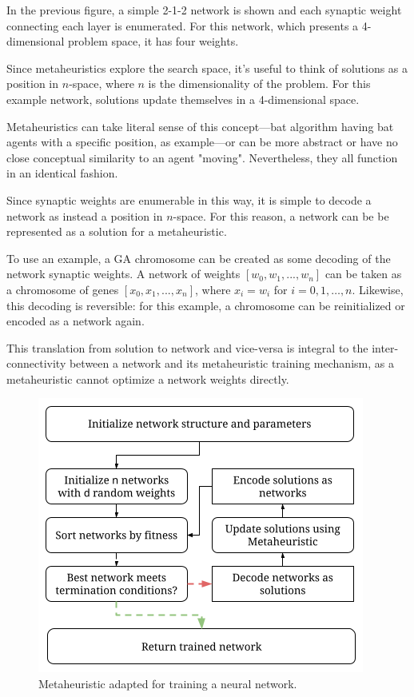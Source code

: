 \documentclass[a4paper,12pt]{article}
\begin{document}
In the previous figure, a simple 2-1-2 network is shown and each synaptic weight connecting each layer is enumerated. For this network, which presents a 4-dimensional problem space, it has four weights.

Since metaheuristics explore the search space, it's useful to think of solutions as a position in $n$-space, where $n$ is the dimensionality of the problem. For this example network, solutions update themselves in a 4-dimensional space.

Metaheuristics can take literal sense of this concept---bat algorithm having bat agents with a specific position, as example---or can be more abstract or have no close conceptual similarity to an agent "moving". Nevertheless, they all function in an identical fashion.

\pagebreak

Since synaptic weights are enumerable in this way, it is simple to decode a network as instead a position in $n$-space. For this reason, a network can be be represented as a solution for a metaheuristic.

To use an example, a GA chromosome can be created as some decoding of the network synaptic weights. A network of weights $[w_0, w_1, ..., w_n]$ can be taken as a chromosome of genes $[x_0, x_1, ..., x_n]$, where $x_i = w_i$ for $i = 0, 1, \dots, n$. Likewise, this decoding is reversible: for this example, a chromosome can be reinitialized or encoded as a network again.

This translation from solution to network and vice-versa is integral to the inter-connectivity between a network and its metaheuristic training mechanism, as a metaheuristic cannot optimize a network weights directly.

\begin{figure}[h!]
\centering
\includegraphics[scale=0.80]{images/training-visualization.png}
\caption{Metaheuristic adapted for training a neural network.}
\label{fig:training-vis}
\end{figure}
\end{document}
